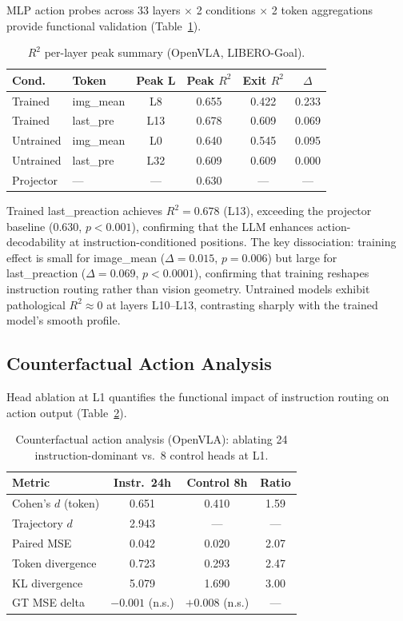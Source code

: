 \documentclass[10pt,twocolumn]{article}
\begin{document}
MLP action probes across 33 layers $\times$ 2 conditions $\times$ 2 token aggregations provide functional validation (Table~\ref{tab:r2}).

\begin{table}[t]
\centering
\caption{$R^2$ per-layer peak summary (OpenVLA, LIBERO-Goal).}
\label{tab:r2}
\small
\begin{tabular}{llcccc}
\toprule
Cond. & Token & Peak L & Peak $R^2$ & Exit $R^2$ & $\Delta$ \\
\midrule
Trained & img\_mean & L8 & 0.655 & 0.422 & 0.233 \\
Trained & last\_pre & L13 & 0.678 & 0.609 & 0.069 \\
Untrained & img\_mean & L0 & 0.640 & 0.545 & 0.095 \\
Untrained & last\_pre & L32 & 0.609 & 0.609 & 0.000 \\
Projector & --- & --- & 0.630 & --- & --- \\
\bottomrule
\end{tabular}
\end{table}

Trained last\_preaction achieves $R^2 = 0.678$ (L13), exceeding the projector baseline ($0.630$, $p < 0.001$), confirming that the LLM enhances action-decodability at instruction-conditioned positions.
The key dissociation: training effect is small for image\_mean ($\Delta = 0.015$, $p = 0.006$) but large for last\_preaction ($\Delta = 0.069$, $p < 0.0001$), confirming that training reshapes instruction routing rather than vision geometry.
Untrained models exhibit pathological $R^2 \approx 0$ at layers L10--L13, contrasting sharply with the trained model's smooth profile.

\subsection{Counterfactual Action Analysis}
\label{sec:cf_action}

Head ablation at L1 quantifies the functional impact of instruction routing on action output (Table~\ref{tab:cf_action}).

\begin{table}[t]
\centering
\caption{Counterfactual action analysis (OpenVLA): ablating 24 instruction-dominant vs.\ 8 control heads at L1.}
\label{tab:cf_action}
\small
\begin{tabular}{lccc}
\toprule
Metric & Instr.\ 24h & Control 8h & Ratio \\
\midrule
Cohen's $d$ (token) & 0.651 & 0.410 & 1.59 \\
Trajectory $d$ & 2.943 & --- & --- \\
Paired MSE & 0.042 & 0.020 & 2.07 \\
Token divergence & 0.723 & 0.293 & 2.47 \\
KL divergence & 5.079 & 1.690 & 3.00 \\
GT MSE delta & $-0.001$ (n.s.) & $+0.008$ (n.s.) & --- \\
\bottomrule
\end{tabular}
\end{table}
\end{document}
